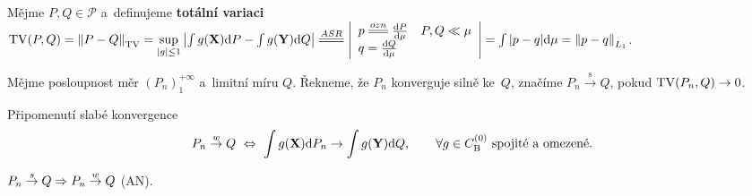 \begin{define}
	Mějme $P,Q\in\mathcal{P}$ a~definujeme \textbf{totální variaci} $\TV(P,Q)=\left\|P-Q\right\|_\TV=\sup\limits_{|g|\leq 1}\left| \int g(\X)\d P-\int g(\Y)\d Q \right|\equal{ASR}\left|\begin{array}{l}
	p\equal{ozn}\frac{\d P}{\d \mu}\quad P,Q\ll\mu\\ q=\frac{\d Q}{\d \mu}
	\end{array}
	\right|=\int |p-q|\d\mu=\left\|p-q\right\|_{L_1}$.
\end{define}
\begin{define}
	Mějme posloupnost měr $(P_n)_1^{+\infty}$ a~limitní míru $Q$. Řekneme, že $P_n$ konverguje silně ke~$Q$, značíme $P_n\stackrel{\text{s}}{\rightarrow}Q$, pokud $\mathrm{TV}(P_n,Q)\to0$.
\end{define}
\begin{remark}{Připomenutí slabé konvergence}
	$$ P_n\stackrel{w}{\to} Q~\Leftrightarrow~\int g(\textbf{X})\mathrm{d} P_n\to\int g(\textbf{Y})\mathrm{d} Q,\qquad \forall g\in C_\mathrm{B}^{(0)}\text{ spojité a~omezené.}$$
\end{remark}

\begin{theorem}
	$P_n\stackrel{s}{\to}Q\Rightarrow P_n\stackrel{w}{\to} Q$ (AN).
\end{theorem}

